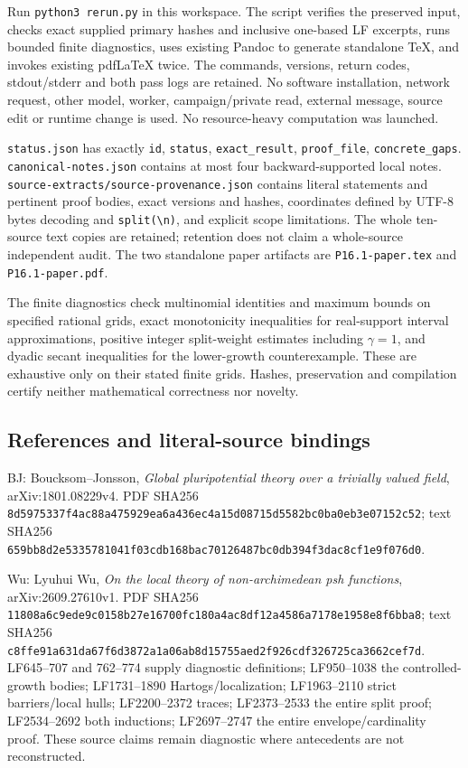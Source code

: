 \documentclass[
  10pt,
]{article}
\begin{document}
Run \texttt{python3\ rerun.py} in this workspace. The script verifies
the preserved input, checks exact supplied primary hashes and inclusive
one-based LF excerpts, runs bounded finite diagnostics, uses existing
Pandoc to generate standalone TeX, and invokes existing pdfLaTeX twice.
The commands, versions, return codes, stdout/stderr and both pass logs
are retained. No software installation, network request, other model,
worker, campaign/private read, external message, source edit or runtime
change is used. No resource-heavy computation was launched.

\texttt{status.json} has exactly \texttt{id}, \texttt{status},
\texttt{exact\_result}, \texttt{proof\_file}, \texttt{concrete\_gaps}.
\texttt{canonical-notes.json} contains at most four backward-supported
local notes. \texttt{source-extracts/source-provenance.json} contains
literal statements and pertinent proof bodies, exact versions and
hashes, coordinates defined by UTF-8 bytes decoding and
\texttt{split(\textquotesingle{}\textbackslash{}n\textquotesingle{})},
and explicit scope limitations. The whole ten-source text copies are
retained; retention does not claim a whole-source independent audit. The
two standalone paper artifacts are \texttt{P16.1-paper.tex} and
\texttt{P16.1-paper.pdf}.

The finite diagnostics check multinomial identities and maximum bounds
on specified rational grids, exact monotonicity inequalities for
real-support interval approximations, positive integer split-weight
estimates including \(\gamma=1\), and dyadic secant inequalities for the
lower-growth counterexample. These are exhaustive only on their stated
finite grids. Hashes, preservation and compilation certify neither
mathematical correctness nor novelty.

\subsection{References and literal-source
bindings}\label{references-and-literal-source-bindings}

BJ: Boucksom--Jonsson, \emph{Global pluripotential theory over a
trivially valued field}, arXiv:1801.08229v4. PDF SHA256
\texttt{8d5975337f4ac88a475929ea6a436ec4a15d08715d5582bc0ba0eb3e07152c52};
text SHA256
\texttt{659bb8d2e5335781041f03cdb168bac70126487bc0db394f3dac8cf1e9f076d0}.

Wu: Lyuhui Wu, \emph{On the local theory of non-archimedean psh
functions}, arXiv:2609.27610v1. PDF SHA256
\texttt{11808a6c9ede9c0158b27e16700fc180a4ac8df12a4586a7178e1958e8f6bba8};
text SHA256
\texttt{c8ffe91a631da67f6d3872a1a06ab8d15755aed2f926cdf326725ca3662cef7d}.
LF645--707 and 762--774 supply diagnostic definitions; LF950--1038 the
controlled-growth bodies; LF1731--1890 Hartogs/localization;
LF1963--2110 strict barriers/local hulls; LF2200--2372 traces;
LF2373--2533 the entire split proof; LF2534--2692 both inductions;
LF2697--2747 the entire envelope/cardinality proof. These source claims
remain diagnostic where antecedents are not reconstructed.
\end{document}
